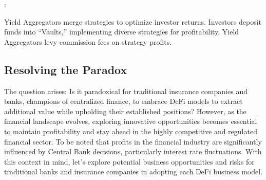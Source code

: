 \documentclass[letterpaper,10pt,english]{jupyterBook}
\begin{document}
\sphinxAtStartPar
{}:

\sphinxAtStartPar
Yield Aggregators merge strategies to optimize investor returns. Investors deposit funds into “Vaults,” implementing diverse strategies for profitability. Yield Aggregators levy commission fees on strategy profits.


\subsection{Resolving the Paradox}
\label{\detokenize{BOER/boer:resolving-the-paradox}}
\sphinxAtStartPar
The question arises: Is it paradoxical for traditional insurance companies and banks, champions of centralized finance, to embrace DeFi models to extract additional value while upholding their established positions? However, as the financial landscape evolves, exploring innovative opportunities becomes essential to maintain profitability and stay ahead in the highly competitive and regulated financial sector. To be noted that profits in the financial industry are significantly influenced by Central Bank decisions, particularly interest rate fluctuations.  With this context in mind, let’s explore potential business opportunities and risks for traditional banks and insurance companies in adopting each DeFi business model.
\end{document}
